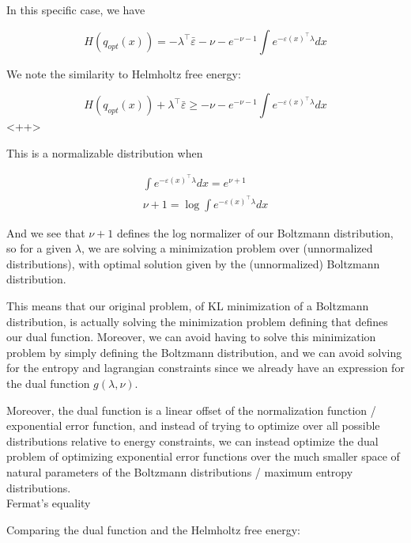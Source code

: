 \documentclass[a4paper]{article}
\begin{document}
In this specific case, we have

\begin{equation}
  H(q_{opt}(x)) = - \lambda^\intercal \bar{\varepsilon} - \nu - e^{-\nu-1} \int e^{-\varepsilon(x)^\intercal \lambda} dx
  \label{}
\end{equation}

We note the similarity to Helmholtz free energy:

\begin{equation}
  H( q_{opt}(x) ) + \lambda^\intercal \bar{\varepsilon} \geq - \nu - e^{-\nu-1} \int e^{ - \varepsilon(x)^\intercal \lambda} dx
  \label{<++>}
\end{equation}<++>

This is a normalizable distribution when

\begin{equation}
  \begin{split}
    \int e^{-\varepsilon(x)^\intercal \lambda} dx = e^{ \nu + 1} \\
    \nu + 1 = \log \int e^{ - \varepsilon(x)^\intercal \lambda } dx
  \end{split}
  \label{}
\end{equation}

And we see that $\nu + 1$ defines the log normalizer of our Boltzmann distribution, so for a given $\lambda$, we are solving a minimization problem over (unnormalized distributions), with optimal solution given by the (unnormalized) Boltzmann distribution.

This means that our original problem, of KL minimization of a Boltzmann distribution, is actually solving the minimization problem defining that defines our dual function.  Moreover, we can avoid having to solve this minimization problem by simply defining the Boltzmann distribution, and we can avoid solving for the entropy and lagrangian constraints since we already have an expression for the dual function $g(\lambda, \nu)$.  

Moreover, the dual function is a linear offset of the normalization function / exponential error function, and instead of trying to optimize over all possible distributions relative to energy constraints, we can instead optimize the dual problem of optimizing exponential error functions over the much smaller space of natural parameters of the Boltzmann distributions / maximum entropy distributions. \\

Fermat's equality 

Comparing the dual function and the Helmholtz free energy:
\end{document}
